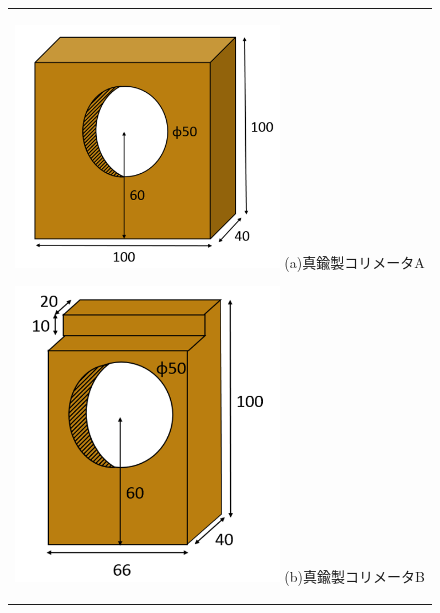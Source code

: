 \begin{figure}[H]
	\centering
		\begin{tabular}{c}
			\begin{minipage}{0.5\hsize}
				\centering
					\includegraphics[width=70mm]{fig/isb/collimator1.png}
					\hspace{1.6cm} (a)真鍮製コリメータA
			\end{minipage}
			\begin{minipage}{0.5\hsize}
				\centering
					\includegraphics[width=70mm]{fig/isb/collimator2.png}
					\hspace{1.6cm} (b)真鍮製コリメータB
			\end{minipage}
		\end{tabular}
\end{figure}

